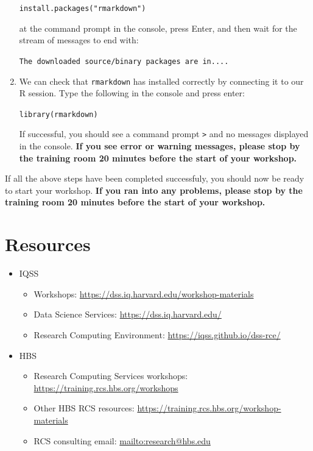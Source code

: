 \documentclass[]{book}
\providecommand{\tightlist}{%
  \setlength{\itemsep}{0pt}\setlength{\parskip}{0pt}}
\begin{document}
\begin{enumerate}
  \texttt{install.packages("rmarkdown")}

  at the command prompt in the console, press Enter, and then wait for
  the stream of messages to end with:

  \texttt{The\ downloaded\ source/binary\ packages\ are\ in....}
\item
  We can check that \texttt{rmarkdown} has installed correctly by
  connecting it to our R session. Type the following in the console and
  press enter:

  \texttt{library(rmarkdown)}

  If successful, you should see a command prompt \texttt{\textgreater{}}
  and no messages displayed in the console. \textbf{If you see error or
  warning messages, please stop by the training room 20 minutes before
  the start of your workshop.}
\end{enumerate}

If all the above steps have been completed successfuly, you should now
be ready to start your workshop. \textbf{If you ran into any problems,
please stop by the training room 20 minutes before the start of your
workshop.}

\section{Resources}\label{resources-1}

\begin{itemize}
\tightlist
\item
  IQSS

  \begin{itemize}
  \tightlist
  \item
    Workshops: \url{https://dss.iq.harvard.edu/workshop-materials}
  \item
    Data Science Services: \url{https://dss.iq.harvard.edu/}
  \item
    Research Computing Environment:
    \url{https://iqss.github.io/dss-rce/}
  \end{itemize}
\item
  HBS

  \begin{itemize}
  \tightlist
  \item
    Research Computing Services workshops:
    \url{https://training.rcs.hbs.org/workshops}
  \item
    Other HBS RCS resources:
    \url{https://training.rcs.hbs.org/workshop-materials}
  \item
    RCS consulting email: \url{mailto:research@hbs.edu}
  \end{itemize}
\end{itemize}
\end{document}
